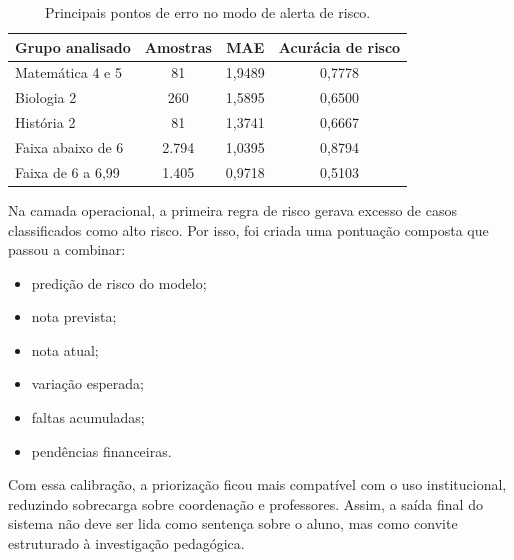 \begin{table}[ht]
\caption{Principais pontos de erro no modo de alerta de risco.}
\label{tab:erro-alerta}
\centering
\footnotesize
\begin{tabular}{l c c c}
\hline
\textbf{Grupo analisado} & \textbf{Amostras} & \textbf{MAE} & \textbf{Acur\'acia de risco} \\
\hline
Matem\'atica 4 e 5 & 81 & 1,9489 & 0,7778 \\
Biologia 2 & 260 & 1,5895 & 0,6500 \\
Hist\'oria 2 & 81 & 1,3741 & 0,6667 \\
Faixa abaixo de 6 & 2.794 & 1,0395 & 0,8794 \\
Faixa de 6 a 6,99 & 1.405 & 0,9718 & 0,5103 \\
\hline
\end{tabular}
\end{table}

Na camada operacional, a primeira regra de risco gerava excesso de casos classificados como alto risco. Por isso, foi criada uma pontua\c{c}\~ao composta que passou a combinar:

\begin{itemize}
    \item predi\c{c}\~ao de risco do modelo;
    \item nota prevista;
    \item nota atual;
    \item varia\c{c}\~ao esperada;
    \item faltas acumuladas;
    \item pend\^encias financeiras.
\end{itemize}

Com essa calibra\c{c}\~ao, a prioriza\c{c}\~ao ficou mais compat\'ivel com o uso institucional, reduzindo sobrecarga sobre coordena\c{c}\~ao e professores. Assim, a sa\'ida final do sistema n\~ao deve ser lida como senten\c{c}a sobre o aluno, mas como convite estruturado \`a investiga\c{c}\~ao pedag\'ogica.
